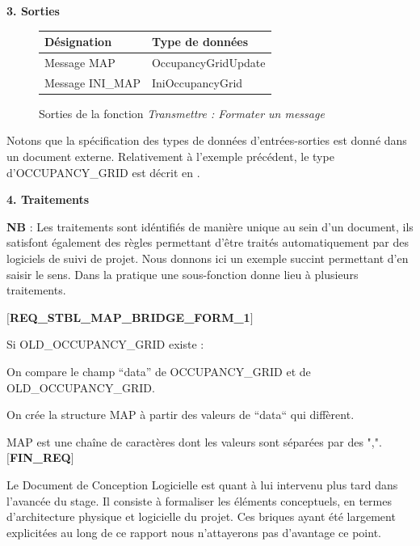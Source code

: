   \textbf{3. Sorties }
  \begin{figure}[!h]
    \begin{center}
      \begin{tabular}{|l|l|}
	\hline
	\textbf{Désignation} & \textbf{Type de données} \\
	\hline
	Message MAP & OccupancyGridUpdate \\
	Message INI\_MAP & IniOccupancyGrid \\
	\hline
      \end{tabular}
    \end{center}
    \caption{Sorties de la fonction \emph{Transmettre : Formater un message}}
  \end{figure}
  
  Notons que la spécification des types de données d'entrées-sorties est donné dans un document externe. 
  Relativement à l'exemple précédent, le type d'OCCUPANCY\_GRID est décrit en .  
  
  \textbf{4. Traitements }
  
  \textbf{NB} : Les traitements sont idéntifiés de manière unique au sein d'un document, ils satisfont également des règles permettant d'être traités automatiquement par des logiciels de suivi de projet. 
  Nous donnons ici un exemple succint permettant d'en saisir le sens. Dans la pratique une sous-fonction donne lieu à plusieurs traitements.
  
  \textbf{$[$REQ\_STBL\_MAP\_BRIDGE\_FORM\_1$]$}
  
    \hspace{10mm} Si OLD\_OCCUPANCY\_GRID existe : 
    
    \hspace{10mm} On compare le champ ``data'' de OCCUPANCY\_GRID et de 
    \\ OLD\_OCCUPANCY\_GRID. 
    
    \hspace{10mm} On crée la structure MAP à partir des valeurs de ``data`` qui diffèrent. 
    
    \hspace{10mm} MAP est une chaîne de caractères dont les valeurs sont séparées par des ",".\\ 
  \textbf{$[$FIN\_REQ$]$}
  
  Le Document de Conception Logicielle est quant à lui intervenu plus tard dans l'avancée du stage. 
  Il consiste à formaliser les éléments conceptuels, en termes d'architecture physique et logicielle du projet. 
  Ces briques ayant été largement explicitées au long de ce rapport nous n'attayerons pas d'avantage ce point. 
  

